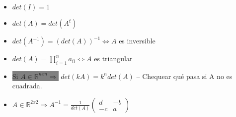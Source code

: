 \begin{enumerate}
\begin{itemize}
        \item $det(I) = 1$
        \item $det(A) = det(A^t)$
        \item $det(A^{-1}) = (det(A))^{-1} \iff A$ es inversible
        \item $det(A) = \prod_{i=1}^{n}a_{ii} \iff A$ es triangular 
        \item \colorbox{Gray}{Si $A \in \mathbb{R}^{nxn} \Rightarrow$} $det(kA) = k^ndet(A)$ -- Chequear qué pasa si A no es cuadrada.
        \item $A \in \mathbb{R}^{2x2} \Rightarrow A^{-1} = \frac{1}{det(A)} \begin{pmatrix}
                        d & -b\\
                        -c & a
                        \end{pmatrix}$
    \end{itemize}
\end{enumerate}

